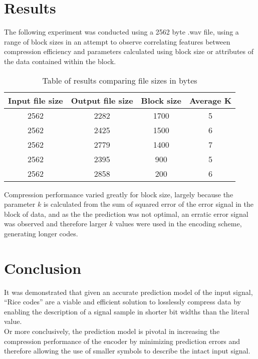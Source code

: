 \documentclass{article}
\begin{document}
\section*{Results}

The following experiment was conducted using a 2562 byte .wav file, using a range of block sizes in an attempt to observe correlating features between compression efficiency and parameters calculated using block size or attributes of the data contained within the block.


\begin{table}[h]  
  \centering
  \begin{tabular}{|c|c|c|c|}
    \hline
    \textbf{Input file size} & \textbf{Output file size} & \textbf{Block size} & \textbf{Average K} \\
    \hline
    \hline
    2562 & 2282 & 1700 & 5\\
    \hline
    2562 & 2425 & 1500 & 6\\
    \hline
    2562 & 2779 & 1400 & 7\\
    \hline
    2562 & 2395 & 900 & 5\\
    \hline
    2562 & 2858 & 200 & 6\\
    \hline
  \end{tabular}
  \caption{Table of results comparing file sizes in bytes}
  \label{tab:results}
\end{table}

Compression performance varied greatly for block size, largely because the parameter $k$ is calculated from the sum of squared error of the error signal in the block of data, and as the the prediction was not optimal, an erratic error signal was observed and therefore larger $k$ values were used in the encoding scheme, generating longer codes. \\

\section*{Conclusion}
It was demonstrated that given an accurate prediction model of the input signal, ``Rice codes'' are a viable and efficient solution to losslessly compress data by enabling the description of a signal sample in shorter bit widths than the literal value. \\ 

Or more conclusively, the prediction model is pivotal in increasing the compression performance of the encoder by minimizing prediction errors and therefore allowing the use of smaller symbols to describe the intact input signal. \\
\end{document}
